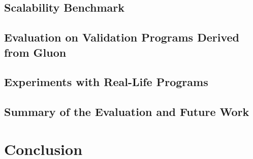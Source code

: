 \section{Scalability Benchmark}
\label{sec:expScal}


\section{Evaluation on Validation Programs Derived from Gluon}
\label{sec:expGluon}


\section{Experiments with Real-Life Programs}
\label{sec:expReal}


\section{Summary of the Evaluation and Future Work}
\label{sec:expSummary}






\chapter{Conclusion}
\label{chap:conc}


